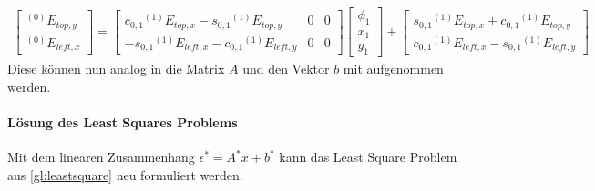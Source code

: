\begin{gather}
    \begin{bmatrix}
        {}^{(0)}E_{top,y}\\
        {}^{(0)}E_{left,x}
    \end{bmatrix} = 
    \begin{bmatrix}
         c_{0,1} {}^{(1)}E_{top,x} - s_{0,1} {}^{(1)}E_{top,y} & 0 & 0\\
         - s_{0,1} {}^{(1)}E_{left,x}  - c_{0,1} {}^{(1)}E_{left,y} & 0& 0
    \end{bmatrix}
    \begin{bmatrix}
        \phi_{1}\\
        x_1\\
        y_1
    \end{bmatrix} +
    \begin{bmatrix}
        s_{0,1} {}^{(1)}E_{top,x} + c_{0,1} {}^{(1)}E_{top,y}\\
        c_{0,1} {}^{(1)}E_{left,x} -s_{0,1} {}^{(1)}E_{left,y}
    \end{bmatrix}
\end{gather}
Diese können nun analog in die Matrix $A$ und den Vektor $b$ mit aufgenommen werden.

\paragraph{Lösung des Least Squares Problems}
Mit dem linearen Zusammenhang $\epsilon^* = A^*x+b^*$ kann das Least Square Problem aus \autoref{gl:leastsquare} neu formuliert werden.

